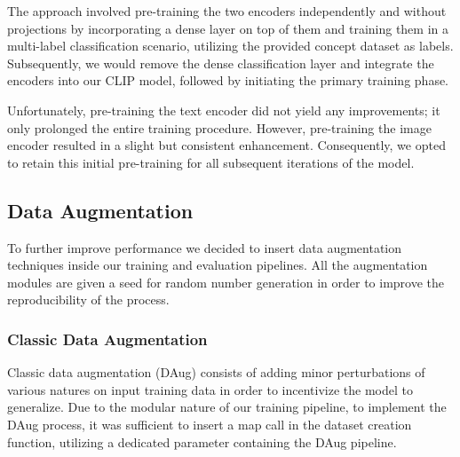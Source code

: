 \documentclass[12pt, a4paper]{article}
\begin{document}
The approach involved pre-training the two encoders independently and without projections by incorporating a dense layer on top of them and training them in a multi-label classification scenario, utilizing the provided concept dataset as labels. Subsequently, we would remove the dense classification layer and integrate the encoders into our CLIP model, followed by initiating the primary training phase.

Unfortunately, pre-training the text encoder did not yield any improvements; it only prolonged the entire training procedure. However, pre-training the image encoder resulted in a slight but consistent enhancement. Consequently, we opted to retain this initial pre-training for all subsequent iterations of the model.

\subsection{Data Augmentation}
To further improve performance we decided to insert data augmentation techniques inside our training and evaluation pipelines.
All the augmentation modules are given a seed for random number generation in order to improve the reproducibility of the process.

\subsubsection{Classic Data Augmentation}
Classic data augmentation (DAug) consists of adding minor perturbations of various natures on input training data in order to incentivize the model to generalize.
Due to the modular nature of our training pipeline, to implement the DAug process, it was sufficient to insert a map call in the dataset creation function, utilizing a dedicated parameter containing the DAug pipeline.
\end{document}
